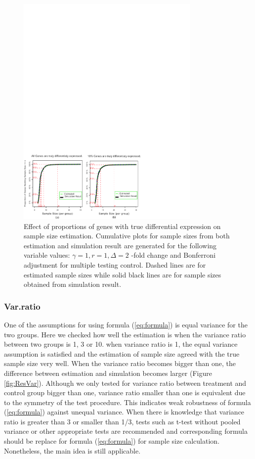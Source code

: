 \documentclass{bioinfo}
\begin{document}
\begin{figure}[h]
  \centerline{\includegraphics*[width=3.5in]{ResAlt.pdf}}
  \caption[Effect of proportions of genes with true differential expression on sample size estimation]
  {Effect of proportions of genes with true differential expression on sample size estimation.
    Cumulative plots for sample sizes from both estimation and simulation result
    are generated for the following variable values: $\gamma = 1, r = 1, \Delta = 2$ -fold change
    and Bonferroni adjustment for multiple testing control. Dashed lines are for estimated sample sizes
    while solid black lines are for sample sizes obtained from simulation result.}
  \label{fig:ResAlt}
\end{figure}

\subsubsection{Var.ratio}

One of the assumptions for using formula (\ref{eq:formula}) is
equal variance for the two groups. Here we checked how well the
estimation is when the variance ratio between two groups is 1, 3
or 10. when variance ratio is 1, the equal variance assumption is
satisfied and the estimation of sample size agreed with the true
sample size very well. When the variance ratio becomes bigger than
one, the difference between estimation and simulation becomes
larger (Figure \ref{fig:ResVar}). Although we only tested for
variance ratio between treatment and control group bigger than
one, variance ratio smaller than one is equivalent due to the
symmetry of the test procedure. This indicates weak robustness of
formula (\ref{eq:formula}) against unequal variance. When there is
knowledge that variance ratio is greater than 3 or smaller than
1/3,  tests such as t-test without pooled variance or other
appropriate tests are recommended and corresponding formula should
be replace for formula (\ref{eq:formula}) for sample size
calculation. Nonetheless, the main idea is still applicable.
\end{document}
